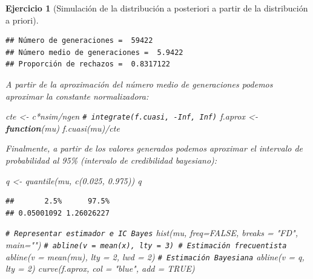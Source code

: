 \documentclass[
]{book}
\newenvironment{Shaded}{\begin{snugshade}}{\end{snugshade}}
\newcommand{\AttributeTok}[1]{\textcolor[rgb]{0.77,0.63,0.00}{#1}}
\newcommand{\CommentTok}[1]{\textcolor[rgb]{0.56,0.35,0.01}{\textit{#1}}}
\newcommand{\ConstantTok}[1]{\textcolor[rgb]{0.00,0.00,0.00}{#1}}
\newcommand{\ControlFlowTok}[1]{\textcolor[rgb]{0.13,0.29,0.53}{\textbf{#1}}}
\newcommand{\DecValTok}[1]{\textcolor[rgb]{0.00,0.00,0.81}{#1}}
\newcommand{\FloatTok}[1]{\textcolor[rgb]{0.00,0.00,0.81}{#1}}
\newcommand{\FunctionTok}[1]{\textcolor[rgb]{0.00,0.00,0.00}{#1}}
\newcommand{\NormalTok}[1]{#1}
\newcommand{\OtherTok}[1]{\textcolor[rgb]{0.56,0.35,0.01}{#1}}
\newcommand{\SpecialCharTok}[1]{\textcolor[rgb]{0.00,0.00,0.00}{#1}}
\newcommand{\StringTok}[1]{\textcolor[rgb]{0.31,0.60,0.02}{#1}}
\theoremstyle{break}
\newtheorem{exercise}{Ejercicio}[chapter]
\theoremstyle{nonumberplain}
\renewcommand{\CommentTok}[1]{\textcolor[rgb]{0.41,0.41,0.41}{\texttt{#1}}}
\begin{document}
\begin{exercise}[Simulación de la distribución a posteriori a partir de la distribución a priori]
\begin{enumerate}
\begin{verbatim}
## Número de generaciones =  59422
## Número medio de generaciones =  5.9422
## Proporción de rechazos =  0.8317122
\end{verbatim}

  A partir de la aproximación del número medio de generaciones podemos aproximar la constante normalizadora:

\begin{Shaded}
\begin{Highlighting}[]
\NormalTok{cte }\OtherTok{\textless{}{-}}\NormalTok{ c}\SpecialCharTok{*}\NormalTok{nsim}\SpecialCharTok{/}\NormalTok{ngen}
\CommentTok{\# integrate(f.cuasi, {-}Inf, Inf)}
\NormalTok{f.aprox }\OtherTok{\textless{}{-}} \ControlFlowTok{function}\NormalTok{(mu) }\FunctionTok{f.cuasi}\NormalTok{(mu)}\SpecialCharTok{/}\NormalTok{cte}
\end{Highlighting}
\end{Shaded}

  Finalmente, a partir de los valores generados podemos aproximar el intervalo de probabilidad al 95\% (intervalo de credibilidad bayesiano):

\begin{Shaded}
\begin{Highlighting}[]
\NormalTok{q }\OtherTok{\textless{}{-}} \FunctionTok{quantile}\NormalTok{(mu, }\FunctionTok{c}\NormalTok{(}\FloatTok{0.025}\NormalTok{, }\FloatTok{0.975}\NormalTok{))}
\NormalTok{q}
\end{Highlighting}
\end{Shaded}

\begin{verbatim}
##       2.5%      97.5% 
## 0.05001092 1.26026227
\end{verbatim}

\begin{Shaded}
\begin{Highlighting}[]
\CommentTok{\# Representar estimador e IC Bayes}
\FunctionTok{hist}\NormalTok{(mu, }\AttributeTok{freq=}\ConstantTok{FALSE}\NormalTok{, }\AttributeTok{breaks =} \StringTok{"FD"}\NormalTok{, }\AttributeTok{main=}\StringTok{""}\NormalTok{)}
\CommentTok{\# abline(v = mean(x), lty = 3) \# Estimación frecuentista}
\FunctionTok{abline}\NormalTok{(}\AttributeTok{v =} \FunctionTok{mean}\NormalTok{(mu), }\AttributeTok{lty =} \DecValTok{2}\NormalTok{, }\AttributeTok{lwd =} \DecValTok{2}\NormalTok{)  }\CommentTok{\# Estimación Bayesiana}
\FunctionTok{abline}\NormalTok{(}\AttributeTok{v =}\NormalTok{ q, }\AttributeTok{lty =} \DecValTok{2}\NormalTok{)}
\FunctionTok{curve}\NormalTok{(f.aprox, }\AttributeTok{col =} \StringTok{"blue"}\NormalTok{, }\AttributeTok{add =} \ConstantTok{TRUE}\NormalTok{)}
\end{Highlighting}
\end{Shaded}


\end{enumerate}
\end{exercise}
\end{document}

